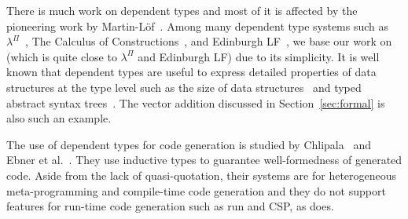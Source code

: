 
There is much work on dependent types and most of it is affected by
the pioneering work by Martin-L\"{o}f~\cite{martin1973intuitionistic}.
Among many dependent type systems such as
$\lambda^\Pi$~\cite{Meyer1986}, The Calculus of
Constructions~\cite{coquand:inria-00076024}, and Edinburgh
LF~\cite{harper1993framework}, we base our work on \LLF~\cite{attapl}
(which is quite close to $\lambda^\Pi$ and Edinburgh LF) due to its
simplicity.  It is well known that dependent types are useful to
express detailed properties of data structures at the type level such
as the size of data structures~\cite{Xi98} and typed abstract syntax
trees~\cite{DBLP:conf/dsl/LeijenM99,DBLP:conf/popl/XiCC03}.  The
vector addition discussed in Section~\ref{sec:formal} is also such an
example.






The use of dependent types for code generation is studied by
Chlipala~\cite{chlipala2010ur} and Ebner et
al.~\cite{DBLP:journals/pacmpl/EbnerURAM17}.  They use inductive types
to guarantee well-formedness of generated code.  Aside from the lack
of quasi-quotation, their systems are for heterogeneous
meta-programming and compile-time code generation and they do not
support features for run-time code generation such as run and CSP, as \LMD{} does.

